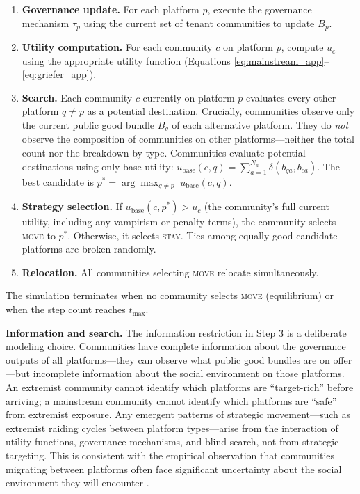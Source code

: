 \documentclass{article}
\begin{document}
\begin{enumerate}
    \item \textbf{Governance update.} For each platform $p$, execute the governance mechanism $\tau_p$ using the current set of tenant communities to update $B_p$.

    \item \textbf{Utility computation.} For each community $c$ on platform $p$, compute $u_c$ using the appropriate utility function (Equations \ref{eq:mainstream_app}--\ref{eq:griefer_app}).

    \item \textbf{Search.} Each community $c$ currently on platform $p$ evaluates every other platform $q \neq p$ as a potential destination. Crucially, communities observe only the current public good bundle $B_q$ of each alternative platform. They do \textit{not} observe the composition of communities on other platforms---neither the total count nor the breakdown by type. Communities evaluate potential destinations using only base utility: $u_{\text{base}}(c, q) = \sum_{a=1}^{N_a} \delta(b_{qa}, b_{ca})$. The best candidate is $p^* = \arg\max_{q \neq p} \; u_{\text{base}}(c, q)$.

    \item \textbf{Strategy selection.} If $u_{\text{base}}(c, p^*) > u_c$ (the community's full current utility, including any vampirism or penalty terms), the community selects \textsc{move} to $p^*$. Otherwise, it selects \textsc{stay}. Ties among equally good candidate platforms are broken randomly.

    \item \textbf{Relocation.} All communities selecting \textsc{move} relocate simultaneously.
\end{enumerate}

\noindent The simulation terminates when no community selects \textsc{move} (equilibrium) or when the step count reaches $t_{\max}$.

\textbf{Information and search.} The information restriction in Step 3 is a deliberate modeling choice. Communities have complete information about the governance outputs of all platforms---they can observe what public good bundles are on offer---but incomplete information about the social environment on those platforms. An extremist community cannot identify which platforms are ``target-rich'' before arriving; a mainstream community cannot identify which platforms are ``safe'' from extremist exposure. Any emergent patterns of strategic movement---such as extremist raiding cycles between platform types---arise from the interaction of utility functions, governance mechanisms, and blind search, not from strategic targeting. This is consistent with the empirical observation that communities migrating between platforms often face significant uncertainty about the social environment they will encounter \citep{fiesler2020moving, chandrasekharan2017you}.
\end{document}

